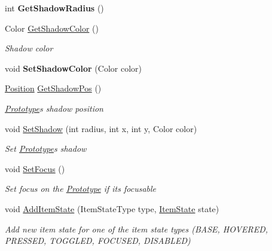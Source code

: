 \begin{DoxyCompactItemize}
\mbox{\label{class_space_v_i_l_1_1_prototype_a19bad31155303f2623d1bfd9d977cd77}} 
int {\bfseries Get\+Shadow\+Radius} ()
\item 
Color \mbox{\hyperlink{class_space_v_i_l_1_1_prototype_add10105022c0f37835efb3efbd74ad26}{Get\+Shadow\+Color}} ()
\begin{DoxyCompactList}\small\item\em Shadow color \end{DoxyCompactList}\item 
\mbox{\label{class_space_v_i_l_1_1_prototype_a6f6e5b698d7c16d210905df07300c61e}} 
void {\bfseries Set\+Shadow\+Color} (Color color)
\item 
\mbox{\hyperlink{class_space_v_i_l_1_1_core_1_1_position}{Position}} \mbox{\hyperlink{class_space_v_i_l_1_1_prototype_a42554735fe0d8e87111757ccbf96d0e9}{Get\+Shadow\+Pos}} ()
\begin{DoxyCompactList}\small\item\em \mbox{\hyperlink{class_space_v_i_l_1_1_prototype}{Prototype}}\textquotesingle{}s shadow position \end{DoxyCompactList}\item 
void \mbox{\hyperlink{class_space_v_i_l_1_1_prototype_a98da84353a0b057b2720d77a12367b2b}{Set\+Shadow}} (int radius, int x, int y, Color color)
\begin{DoxyCompactList}\small\item\em Set \mbox{\hyperlink{class_space_v_i_l_1_1_prototype}{Prototype}}\textquotesingle{}s shadow \end{DoxyCompactList}\item 
void \mbox{\hyperlink{class_space_v_i_l_1_1_prototype_aa91a8d681b1d1c597aa87d644c9e19a5}{Set\+Focus}} ()
\begin{DoxyCompactList}\small\item\em Set focus on the \mbox{\hyperlink{class_space_v_i_l_1_1_prototype}{Prototype}} if its focusable \end{DoxyCompactList}\item 
void \mbox{\hyperlink{class_space_v_i_l_1_1_prototype_abe7d58e0439b1ca3485ecb45683fdd12}{Add\+Item\+State}} (Item\+State\+Type type, \mbox{\hyperlink{class_space_v_i_l_1_1_decorations_1_1_item_state}{Item\+State}} state)
\begin{DoxyCompactList}\small\item\em Add new item state for one of the item state types (B\+A\+SE, H\+O\+V\+E\+R\+ED, P\+R\+E\+S\+S\+ED, T\+O\+G\+G\+L\+ED, F\+O\+C\+U\+S\+ED, D\+I\+S\+A\+B\+L\+ED) \end{DoxyCompactList}\item 

\end{DoxyCompactItemize}
